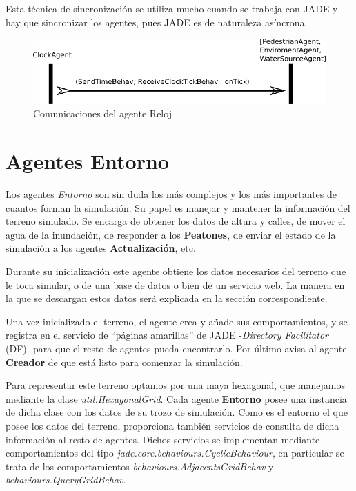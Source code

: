 Esta técnica de sincronización se utiliza mucho cuando se trabaja con JADE y
hay que sincronizar los agentes, pues JADE es de naturaleza asíncrona.

\begin{figure}[H]
 \centering
 \includegraphics[width=120mm]{figuras/cap5/com_clock.png}
 \caption{Comunicaciones del agente Reloj}
\end{figure}

\section*{Agentes Entorno}

Los agentes {\em Entorno} son sin duda los más complejos y los más importantes
de cuantos forman la simulación. Su papel es manejar y mantener la información
del terreno simulado. Se encarga de obtener los datos de altura y calles, de
mover el agua de la inundación, de responder a los {\bf Peatones}, de enviar el
estado de la simulación a los agentes {\bf Actualización}, etc.

Durante su inicialización este agente obtiene los datos necesarios del terreno
que le toca simular, o de una base de datos o bien de un servicio web. La manera
en la que se descargan estos datos será explicada en la sección correspondiente.

Una vez inicializado el terreno, el agente crea y añade sus comportamientos, y
se registra en el servicio de ``páginas amarillas'' de JADE -{\em Directory
Facilitator} (DF)- para que el resto de agentes pueda encontrarlo. Por último
avisa al agente {\bf Creador} de que está listo para comenzar la simulación.

Para representar este terreno optamos por una maya hexagonal, que manejamos
mediante la clase {\em util.HexagonalGrid}. Cada agente {\bf Entorno} posee una
instancia de dicha clase con los datos de su trozo de simulación. Como es el
entorno el que posee los datos del terreno, proporciona también servicios de
consulta de dicha información al resto de agentes. Dichos servicios se
implementan mediante comportamientos del tipo {\em
jade.core.behaviours.CyclicBehaviour}, en particular se trata de los
comportamientos {\em behaviours.AdjacentsGridBehav} y {\em
behaviours.QueryGridBehav}.

